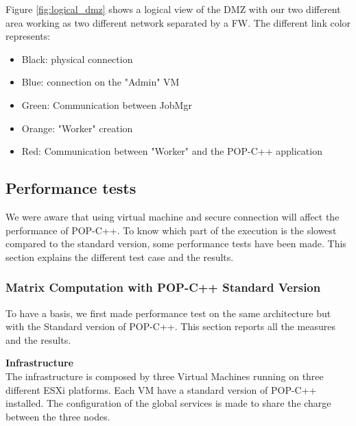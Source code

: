 Figure \ref{fig:logical_dmz} shows a logical view of the DMZ with our two different area working as two different network separated by a FW. The different link color represents: 

\begin{itemize}
\item Black: physical connection
\item Blue: connection on the "Admin" VM
\item Green: Communication between JobMgr
\item Orange: "Worker" creation
\item Red: Communication between "Worker" and the POP-C++ application
\end{itemize}

%
%
\subsection{Performance tests}
We were aware that using virtual machine and secure connection will affect the performance of POP-C++. To know which part of the execution is the slowest compared to the standard version, some performance tests have been made. This section explains the different test case and the results.

\subsubsection{Matrix Computation with POP-C++ Standard Version}
To have a basis, we first made performance test on the same architecture but with the Standard version of POP-C++. This section reports all the measures and the results. \s

\textbf{Infrastructure}\\
The infrastructure is composed by three Virtual Machines running on three different ESXi platforms. Each VM have a standard version of POP-C++ installed. The configuration of the global services is made to share the charge between the three nodes. \s

